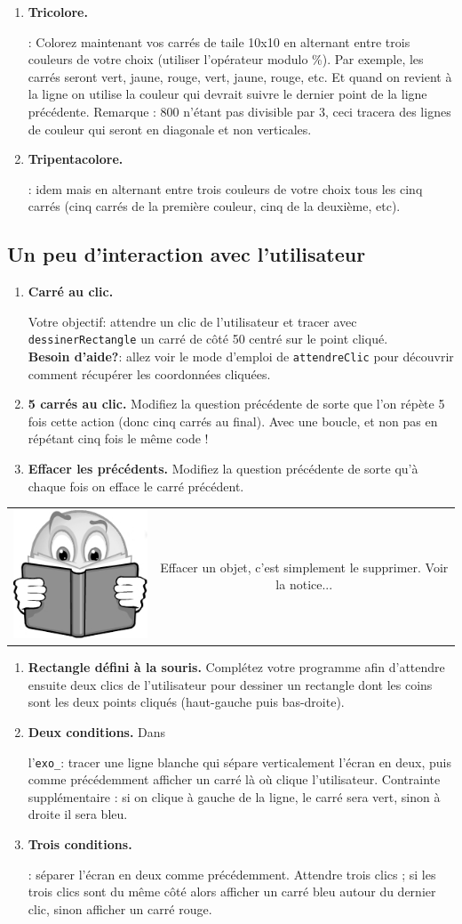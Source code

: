 \documentclass[11pt,a4paper]{article}
\newcommand{\checkbox}{$\square$ \smallskip}
\newenvironment{lecture}{%
\smallskip
\begin{tabular}{c|c}
    \hspace{.03\textwidth} \includegraphics[width=.07\textwidth]{img/lecture.jpg} & 
\begin{minipage}{.85\textwidth}
}{%
\end{minipage}
\end{tabular}
}
\newcounter{exo} \setcounter{exo}{0}
\newenvironment{action}{%
    \begin{enumerate}[\numerotation] \addtocounter{exo}{-1}%
        }{%
    \end{enumerate}
}
\newcommand{\numexoa}{\theexo \addtocounter{exo}{1}}
\newcommand{\numerotation}{\checkbox \smallskip \numexoa.}
\newcounter{exoo} \setcounter{exoo}{0}
\newcommand{\numexo}{\theexoo}
\newcommand{\repexo}{{\tt exo_\numexo}}
\newcommand{\exoplus}{\addtocounter{exoo}{1}}
\begin{document}
\begin{action}
\item {\bf Tricolore.} \exoplus \repexo : Colorez maintenant vos carrés de taile 10x10 en alternant entre trois couleurs de votre choix (utiliser l'opérateur modulo \%). Par exemple, les carrés seront vert, jaune, rouge, vert, jaune, rouge, etc. Et quand on revient à la ligne on utilise la couleur qui devrait suivre le dernier point de la ligne précédente. Remarque : 800 n'étant pas divisible par 3, ceci tracera des lignes de couleur qui seront en diagonale et non verticales.
\item {\bf Tripentacolore.} \exoplus \repexo : idem mais en alternant entre trois couleurs de votre choix tous les cinq carrés (cinq carrés de la première couleur, cinq de la deuxième, etc).
\end{action}

\subsection*{Un peu d'interaction avec l'utilisateur}
\begin{action}
\item {\bf Carré au clic.} \exoplus \repexo Votre objectif: attendre un clic de l'utilisateur et tracer avec {\tt dessinerRectangle} un carré de côté 50 centré sur le point cliqué. \\
{\bf Besoin d'aide?}: allez voir le mode d'emploi de {\tt attendreClic} pour découvrir comment récupérer les coordonnées cliquées.
\item {\bf 5 carrés au clic.} Modifiez la question précédente de sorte que l'on répète 5 fois cette action (donc cinq carrés au final). Avec une boucle, et non pas en répétant cinq fois le même code !
\item {\bf Effacer les précédents.} Modifiez la question précédente de sorte qu'à chaque fois on efface le carré précédent.
\end{action}

\begin{lecture}
    Effacer un objet, c'est simplement le supprimer. Voir la notice...
\end{lecture}
\begin{action}

\item {\bf Rectangle défini à la souris.} Complétez votre programme afin d'attendre ensuite deux clics de l'utilisateur pour dessiner un rectangle dont les coins sont les deux points cliqués (haut-gauche puis bas-droite).

\item {\bf Deux conditions.} Dans \exoplus l'\repexo : tracer une ligne blanche qui sépare verticalement l'écran en deux, puis comme précédemment afficher un carré là où clique l'utilisateur. Contrainte supplémentaire : si on clique à gauche de la ligne, le carré sera vert, sinon à droite il sera bleu.
\item {\bf Trois conditions.} \exoplus \repexo : séparer l'écran en deux comme précédemment. Attendre trois clics ; si les trois clics sont du même côté alors afficher un carré bleu autour du dernier clic, sinon afficher un carré rouge.
\end{action}
\end{document}
